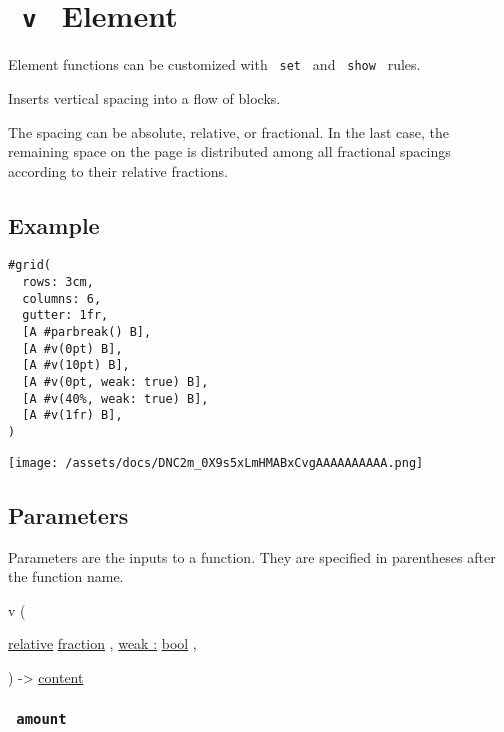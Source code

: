 \section{\texorpdfstring{\texttt{\ v\ } {{ Element
}}}{ v   Element }}\label{summary}

\label{element-tooltip}
Element functions can be customized with \texttt{\ set\ } and
\texttt{\ show\ } rules.

Inserts vertical spacing into a flow of blocks.

The spacing can be absolute, relative, or fractional. In the last case,
the remaining space on the page is distributed among all fractional
spacings according to their relative fractions.

\subsection{Example}\label{example}

\begin{verbatim}
#grid(
  rows: 3cm,
  columns: 6,
  gutter: 1fr,
  [A #parbreak() B],
  [A #v(0pt) B],
  [A #v(10pt) B],
  [A #v(0pt, weak: true) B],
  [A #v(40%, weak: true) B],
  [A #v(1fr) B],
)
\end{verbatim}

\texttt{[image: /assets/docs/DNC2m\_0X9s5xLmHMABxCvgAAAAAAAAAA.png]}

\subsection{\texorpdfstring{{ Parameters
}}{ Parameters }}\label{parameters}

\label{parameters-tooltip}
Parameters are the inputs to a function. They are specified in
parentheses after the function name.

{ v } (

{ \href{/docs/reference/layout/relative/}{relative}
\href{/docs/reference/layout/fraction/}{fraction} , } {
\hyperref[parameters-weak]{weak :}
\href{/docs/reference/foundations/bool/}{bool} , }

) -\textgreater{} \href{/docs/reference/foundations/content/}{content}

\subsubsection{\texorpdfstring{\texttt{\ amount\ }}{ amount }}\label{parameters-amount}

